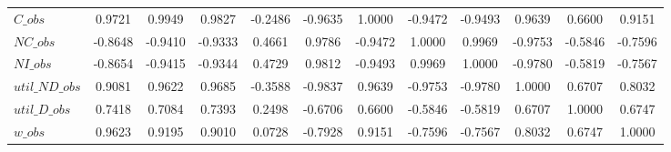 \begin{center}
\begin{longtable}{lccccccccccc}
$C\_obs         $	 & 	           0.9721	 & 	           0.9949	 & 	           0.9827	 & 	          -0.2486	 & 	          -0.9635	 & 	           1.0000	 & 	          -0.9472	 & 	          -0.9493	 & 	           0.9639	 & 	           0.6600	 & 	           0.9151 \\ 
$NC\_obs        $	 & 	          -0.8648	 & 	          -0.9410	 & 	          -0.9333	 & 	           0.4661	 & 	           0.9786	 & 	          -0.9472	 & 	           1.0000	 & 	           0.9969	 & 	          -0.9753	 & 	          -0.5846	 & 	          -0.7596 \\ 
$NI\_obs        $	 & 	          -0.8654	 & 	          -0.9415	 & 	          -0.9344	 & 	           0.4729	 & 	           0.9812	 & 	          -0.9493	 & 	           0.9969	 & 	           1.0000	 & 	          -0.9780	 & 	          -0.5819	 & 	          -0.7567 \\ 
$util\_ND\_obs  $	 & 	           0.9081	 & 	           0.9622	 & 	           0.9685	 & 	          -0.3588	 & 	          -0.9837	 & 	           0.9639	 & 	          -0.9753	 & 	          -0.9780	 & 	           1.0000	 & 	           0.6707	 & 	           0.8032 \\ 
$util\_D\_obs   $	 & 	           0.7418	 & 	           0.7084	 & 	           0.7393	 & 	           0.2498	 & 	          -0.6706	 & 	           0.6600	 & 	          -0.5846	 & 	          -0.5819	 & 	           0.6707	 & 	           1.0000	 & 	           0.6747 \\ 
$w\_obs         $	 & 	           0.9623	 & 	           0.9195	 & 	           0.9010	 & 	           0.0728	 & 	          -0.7928	 & 	           0.9151	 & 	          -0.7596	 & 	          -0.7567	 & 	           0.8032	 & 	           0.6747	 & 	           1.0000 \\ 
\end{longtable}
 \end{center}
